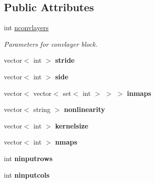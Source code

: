 \subsection*{Public Attributes}
\begin{DoxyCompactItemize}
\item 
\hypertarget{class_configuration_a0a011834331cc1da7029d8b11f8234c8}{int \hyperlink{class_configuration_a0a011834331cc1da7029d8b11f8234c8}{nconvlayers}}\label{class_configuration_a0a011834331cc1da7029d8b11f8234c8}

\begin{DoxyCompactList}\small\item\em Parameters for convlayer block. \end{DoxyCompactList}\item 
\hypertarget{class_configuration_a7ac2cfbbec1546045dc1be84536f3695}{vector$<$ int $>$ {\bfseries stride}}\label{class_configuration_a7ac2cfbbec1546045dc1be84536f3695}

\item 
\hypertarget{class_configuration_ad39650d8d51310b5ddd893c929b72f65}{vector$<$ int $>$ {\bfseries side}}\label{class_configuration_ad39650d8d51310b5ddd893c929b72f65}

\item 
\hypertarget{class_configuration_a3da1ddf46a5065d1d221f34cbfc49461}{vector$<$ vector$<$ set$<$ int $>$ $>$ $>$ {\bfseries inmaps}}\label{class_configuration_a3da1ddf46a5065d1d221f34cbfc49461}

\item 
\hypertarget{class_configuration_abe8c2cd923980da3e929a3bdb23eeb1c}{vector$<$ string $>$ {\bfseries nonlinearity}}\label{class_configuration_abe8c2cd923980da3e929a3bdb23eeb1c}

\item 
\hypertarget{class_configuration_a341a68c414dcb2ad45477bb1235de765}{vector$<$ int $>$ {\bfseries kernelsize}}\label{class_configuration_a341a68c414dcb2ad45477bb1235de765}

\item 
\hypertarget{class_configuration_a02d8967e1bad99a6b3c95faf99e9a985}{vector$<$ int $>$ {\bfseries nmaps}}\label{class_configuration_a02d8967e1bad99a6b3c95faf99e9a985}

\item 
\hypertarget{class_configuration_ac3177157bb1aee35be7b500327f92ea3}{int {\bfseries ninputrows}}\label{class_configuration_ac3177157bb1aee35be7b500327f92ea3}

\item 
\hypertarget{class_configuration_aba850a48423a30765e14d74ea1cbb244}{int {\bfseries ninputcols}}\label{class_configuration_aba850a48423a30765e14d74ea1cbb244}


\end{DoxyCompactItemize}
